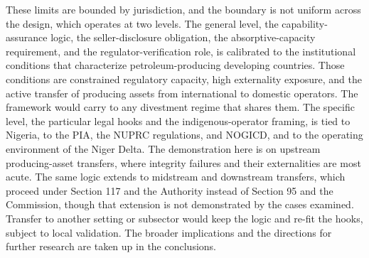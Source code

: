 These limits are bounded by jurisdiction, and the boundary is not
uniform across the design, which operates at two levels. The general
level, the capability-assurance logic, the seller-disclosure obligation,
the absorptive-capacity requirement, and the regulator-verification
role, is calibrated to the institutional conditions that characterize
petroleum-producing developing countries. Those conditions are
constrained regulatory capacity, high externality exposure, and the
active transfer of producing assets from international to domestic
operators. The framework would carry to any divestment regime that
shares them. The specific level, the particular legal hooks and the
indigenous-operator framing, is tied to Nigeria, to the PIA, the NUPRC
regulations, and NOGICD, and to the operating environment of the Niger
Delta. The demonstration here is on upstream producing-asset transfers,
where integrity failures and their externalities are most acute. The
same logic extends to midstream and downstream transfers, which proceed
under Section 117 and the Authority instead of Section 95 and the
Commission, though that extension is not demonstrated by the cases
examined. Transfer to another setting or subsector would keep the logic
and re-fit the hooks, subject to local validation. The broader
implications and the directions for further research are taken up in the
conclusions.
